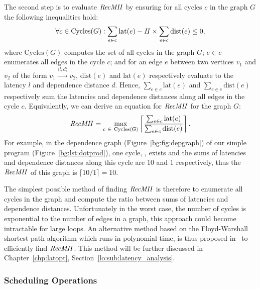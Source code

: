 The second step is to evaluate $\mathit{RecMII}$ by ensuring for all cycles $c$ in the
graph $G$ the following inequalities hold:
\begin{equation}
    \forall c \in \mathrm{Cycles}(G):
        \sum_{e \in c} \mathrm{lat}(e) - \mathit{II} \times
        \sum_{e \in c} \mathrm{dist}(e) \leq 0,
\end{equation}
where $\mathrm{Cycles}(G)$ computes the set of all cycles in the graph $G$;
$e \in c$ enumerates all edges in the cycle $c$; and for an edge $e$ between
two vertices $v_1$ and $v_2$ of the form $v_1 \xrightarrow{\langle l, d
\rangle} v_2$, $\mathrm{dist}(e)$ and $\mathrm{lat}(e)$ respectively evaluate
to the latency $l$ and dependence distance $d$.  Hence, $\sum_{e \in c}
\mathrm{lat}(e)$ and $\sum_{e \in c} \mathrm{dist}(e)$ respectively sum
the latencies and dependence distances along all edges in the cycle $c$.
Equivalently, we can derive an equation for $\mathit{RecMII}$ for the graph $G$:
\begin{equation}
    \RecMII = \max_{c~\in~\mathrm{Cycles}(G)}
        \left\lceil \frac{%
            \sum_{e \in c} \mathrm{lat}(e)
        }{%
            \sum_{e \in c} \mathrm{dist}(e)
        }
        \right\rceil.
\end{equation}
For example, in the dependence graph (Figure~\ref{bg:fig:depgraph}) of our
simple program (Figure~\ref{bg:lst:dotprod}), one cycle,
,
exists and the sums of latencies and dependence distances along this cycle are
$10$ and $1$ respectively, thus the $\mathit{RecMII}$ of this graph is $\lceil 10 / 1
\rceil = 10$.

The simplest possible method of finding $\mathit{RecMII}$ is therefore to enumerate
all cycles in the graph and compute the ratio between sums of latencies and
dependence distances.  Unfortunately in the worst case, the number of cycles
is exponential to the number of edges in a graph, this approach could become
intractable for large loops.  An alternative method based on the Floyd-Warshall
shortest path algorithm which runs in polynomial time, is thus proposed
in~\cite{rau94} to efficiently find $\mathit{RecMII}$.  This method will be further
discussed in Chapter~\ref{chp:latopt}, Section~\ref{lo:sub:latency_analysis}.

\subsubsection{Scheduling Operations}

